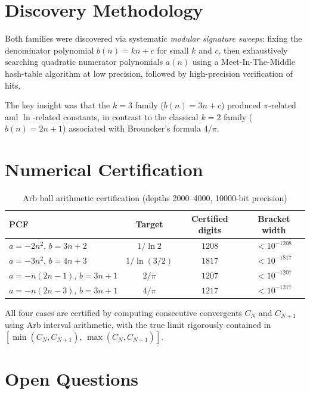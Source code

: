 \documentclass[11pt]{article}
\begin{document}
\section{Discovery Methodology}

Both families were discovered via systematic \emph{modular signature sweeps}:
fixing the denominator polynomial $b(n) = kn + c$ for small $k$ and $c$,
then exhaustively searching quadratic numerator polynomials $a(n)$ using
a Meet-In-The-Middle hash-table algorithm at low precision, followed by
high-precision verification of hits.

The key insight was that the $k = 3$ family ($b(n) = 3n + c$) produced
$\pi$-related and $\ln$-related constants, in contrast to the classical
$k = 2$ family ($b(n) = 2n + 1$) associated with Brouncker's formula $4/\pi$.

\section{Numerical Certification}

\begin{table}[h]
\centering
\caption{Arb ball arithmetic certification (depths 2000--4000, 10000-bit precision)}
\begin{tabular}{lccc}
\hline
PCF & Target & Certified digits & Bracket width \\
\hline
$a = -2n^2,\, b = 3n+2$      & $1/\ln 2$     & $1208$ & $< 10^{-1208}$ \\
$a = -3n^2,\, b = 4n+3$      & $1/\ln(3/2)$  & $1817$ & $< 10^{-1817}$ \\
$a = -n(2n-1),\, b = 3n+1$   & $2/\pi$       & $1207$ & $< 10^{-1207}$ \\
$a = -n(2n-3),\, b = 3n+1$   & $4/\pi$       & $1217$ & $< 10^{-1217}$ \\
\hline
\end{tabular}
\end{table}

\noindent All four cases are certified by computing consecutive convergents
$C_N$ and $C_{N+1}$ using Arb interval arithmetic, with the true limit
rigorously contained in $[\min(C_N, C_{N+1}),\, \max(C_N, C_{N+1})]$.

\section{Open Questions}
\end{document}
